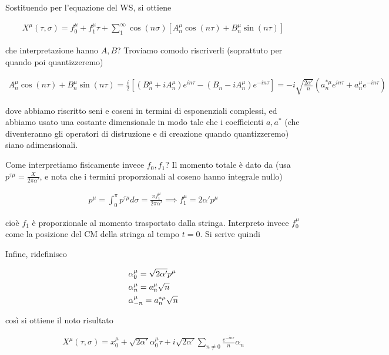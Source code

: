 \documentclass{report}
\begin{document}
Sostituendo per l'equazione del WS, si ottiene 

\begin{align}
    X^\mu (\tau, \sigma) = f_0^\mu + f_1^\mu \tau + \sum_1^\infty \cos(n\sigma)[A_n^\mu \cos(n\tau) + B_n^\mu \sin(n\tau)]
\end{align}

che interpretazione hanno \(A, B\)? Troviamo comodo riscriverli (soprattuto per quando poi quantizzeremo)

\begin{align}
    A^\mu_n \cos(n\tau) + B_n^\mu \sin(n\tau) = \frac{i}{2}[(B_n^\mu + iA_n^\mu)e^{in\tau} - (B_n-iA_n^\mu)e^{-in\tau}] = -i\sqrt{\frac{2\alpha'}{n}}(a_n^{*\mu} e^{in\tau} + a_n^\mu e^{-in\tau})
\end{align}

dove abbiamo riscritto seni e coseni in termini di esponenziali complessi, ed abbiamo usato una costante dimensionale in modo tale che i coefficienti \(a, a^*\) (che diventeranno gli operatori di distruzione e di creazione quando quantizzeremo) siano adimensionali. 

Come interpretiamo fisicamente invece \(f_0, f_1\)? Il momento totale è dato da (usa \(p^{\tau \mu} = \frac{\dot{X}}{2\pi\alpha'}\), e nota che i termini proporzionali al coseno hanno integrale nullo) 

\begin{align}
    p^\mu = \int_0^\pi p^{\tau \mu}d\sigma = \frac{\pi f_1^\mu}{2\pi\alpha'} \implies f_1^\mu = 2\alpha' p^ \mu
\end{align}

cioè \(f_1\) è proporzionale al momento trasportato dalla stringa. Interpreto invece \(f_0^\mu\) come la posizione del CM della stringa al tempo \(t=0\). Si scrive quindi 

Infine, ridefinisco 

\begin{align}
    &\alpha_0^\mu = \sqrt{2\alpha'}p^\mu \notag \\
    &\alpha_n^\mu = a^\mu_n \sqrt{n} \notag \\ 
    &\alpha_{-n}^\mu = a_n^{*\mu}\sqrt{n}
\end{align}

così si ottiene il noto risultato 

\begin{align}
    X^\mu(\tau, \sigma) = x_0^\mu + \sqrt{2\alpha'}\alpha_0^\mu \tau +i\sqrt{2\alpha'}\sum_{n \neq 0}\frac{e^{-in\tau}}{n}\alpha_n
\end{align}
\end{document}
